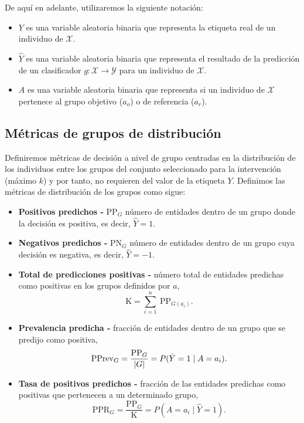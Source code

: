 \documentclass[oneside,openright,titlepage,numbers=noenddot,openany,headinclude,footinclude=true,
cleardoublepage=empty,abstractoff,BCOR=5mm,paper=a4,fontsize=12pt,main=spanish]{scrreprt}
\begin{document}
\begin{notation}
De aquí en adelante, utilizaremos la siguiente notación:

\begin{itemize}
    \item $Y$ es una variable aleatoria binaria que representa la etiqueta real de un individuo de $\mathcal{X}.$
    \item $\hat{Y}$ es una variable aleatoria binaria que representa el resultado de la predicción de un clasificador $g\colon \mathcal{X} \to \mathcal{Y}$ para un individuo de $\mathcal{X}.$
    \item $A$ es una variable aleatoria binaria que representa si un individuo de $\mathcal{X}$ pertenece al grupo objetivo ($a_o$) o de referencia ($a_r$).
\end{itemize}
\end{notation}

\subsection*{Métricas de grupos de distribución}

Definiremos métricas de decisión a nivel de grupo centradas en la distribución de los individuos entre los grupos del conjunto seleccionado para la intervención (máximo $k$) y por
tanto, no requieren del valor de la etiqueta $Y$. Definimos las métricas de distribución de los grupos como sigue:

\begin{itemize}
    \item \textbf{Positivos predichos -} PP$_G$ número de entidades dentro de un grupo donde la decisión es positiva, es decir, $\hat{Y} = 1$.
    \item \textbf{Negativos predichos -} PN$_G$ número de entidades dentro de un grupo cuya decisión es negativa, es decir, $\hat{Y} = -1$.
    \item \textbf{Total de predicciones positivas -} número total de entidades predichas como positivas en los grupos definidos por $a$, $$\text{K} = \sum_{i=1}^{n} \  \text{PP}_{G(a_i)}.$$
    \item \textbf{Prevalencia predicha -} fracción de entidades dentro de un grupo que se predijo como positiva, $$\text{PPrev}_G = \frac{\text{PP}_G}{\left\lvert G\right\rvert} = P(\hat{Y}=1 \mid A=a_i).$$
    \item \textbf{Tasa de positivos predichos -} fracción de las entidades predichas como positivas que pertenecen a un determinado grupo, $$\text{PPR}_G = \frac{\text{PP}_G}{\text{K}} = P(A=a_i \mid \hat{Y}=1).$$
\end{itemize}
\end{document}
